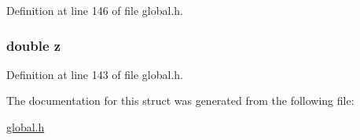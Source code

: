Definition at line 146 of file global.\-h.

\hypertarget{structpartData_ab3e6ed577a7c669c19de1f9c1b46c872}{
\subsubsection[{z}]{\setlength{\rightskip}{0pt plus 5cm}double z}}\label{structpartData_ab3e6ed577a7c669c19de1f9c1b46c872}


Definition at line 143 of file global.\-h.



The documentation for this struct was generated from the following file\-:\begin{DoxyCompactItemize}
\item 
\hyperlink{global_8h}{global.\-h}\end{DoxyCompactItemize}
